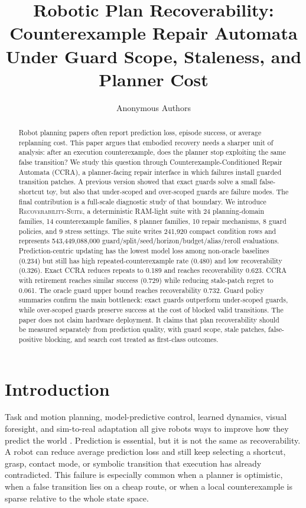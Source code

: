 \documentclass{article}
\title{Robotic Plan Recoverability:\\ Counterexample Repair Automata\\ Under Guard Scope, Staleness, and Planner Cost}
\author{Anonymous Authors}
\newcommand{\ccra}{\textsc{CCRA}}
\newcommand{\suite}{\textsc{Recoverability-Suite}}
\begin{document}
\maketitle

\begin{abstract}
Robot planning papers often report prediction loss, episode success, or average
replanning cost. This paper argues that embodied recovery needs a sharper unit
of analysis: after an execution counterexample, does the planner stop exploiting
the same false transition? We study this question through
Counterexample-Conditioned Repair Automata (\ccra), a planner-facing repair
interface in which failures install guarded transition patches. A previous
version showed that exact guards solve a small false-shortcut toy, but also that
under-scoped and over-scoped guards are failure modes. The final contribution is
a full-scale diagnostic study of that boundary. We introduce \suite{}, a
deterministic RAM-light suite with 24 planning-domain families, 14
counterexample families, 8 planner families, 10 repair mechanisms, 8 guard
policies, and 9 stress settings. The suite writes 241,920 compact condition rows
and represents 543,449,088,000 guard/split/seed/horizon/budget/alias/reroll
evaluations. Prediction-centric updating has the lowest model loss among
non-oracle baselines (0.234) but still has high repeated-counterexample rate
(0.480) and low recoverability (0.326). Exact \ccra{} reduces repeats to 0.189
and reaches recoverability 0.623. \ccra{} with retirement reaches similar
success (0.729) while reducing stale-patch regret to 0.061. The oracle guard
upper bound reaches recoverability 0.732. Guard policy summaries confirm the
main bottleneck: exact guards outperform under-scoped guards, while over-scoped
guards preserve success at the cost of blocked valid transitions. The paper does
not claim hardware deployment. It claims that plan recoverability should be
measured separately from prediction quality, with guard scope, stale patches,
false-positive blocking, and search cost treated as first-class outcomes.
\end{abstract}

\section{Introduction}

Task and motion planning, model-predictive control, learned dynamics, visual
foresight, and sim-to-real adaptation all give robots ways to improve how they
predict the world \citep{ghallab2004automated,lavalle2006planning,
kaelbling2011hierarchical,srivastava2014combined,toussaint2015logic,
garrett2021pddlstream}. Prediction is essential, but it is not the same as
recoverability. A robot can reduce average prediction loss and still keep
selecting a shortcut, grasp, contact mode, or symbolic transition that execution
has already contradicted. This failure is especially common when a planner is
optimistic, when a false transition lies on a cheap route, or when a local
counterexample is sparse relative to the whole state space.
\end{document}
